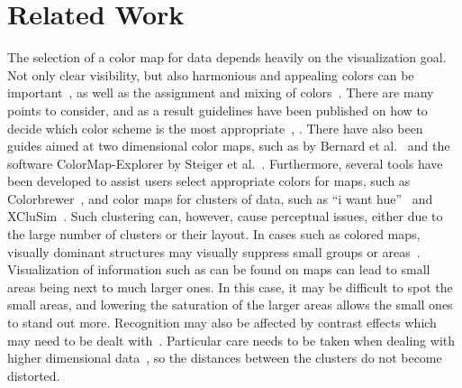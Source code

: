 \documentclass{egpubl}
\begin{document}
	\section{Related Work}

%		
	The selection of a color map for data depends heavily on the visualization goal. 
	Not only clear visibility, but also harmonious and appealing colors can be important~\cite{ihaka2003colour}, as well as the assignment and mixing of colors~\cite{wang2008color}. 
	There are many points to consider, and as a result guidelines have been published on how to decide which color scheme is the most appropriate~\cite{bergman1995rule}, \cite{healey1996choosing}. There have also been guides aimed at two dimensional color maps, such as by Bernard et al.~\cite{bernard2015survey} and the software ColorMap-Explorer by Steiger et al.~\cite{steiger2015explorative}.	
	Furthermore, several tools have been developed to assist users select appropriate colors for maps, such as Colorbrewer~\cite{harrower2003colorbrewer}, and color maps for clusters of data, such as ``i want hue''~\cite{iwanthue} and XCluSim~\cite{l2015xclusim}. 	
	Such clustering can, however, cause perceptual issues, either due to the large number of clusters or their layout.
	In cases such as colored maps, visually dominant structures may visually suppress small groups or areas~\cite{lee2013perceptually}.
	Visualization of information such as can be found on maps can lead to small areas being next to much larger ones. 
	In this case, it may be difficult to spot the small areas, and lowering the saturation of the larger areas allows the small ones to stand out more.
	Recognition may also be affected by contrast effects which may need to be dealt with~\cite{mittelstadt2014methods}. 
	Particular care needs to be taken when dealing with higher dimensional data~\cite{mittelstiidt2014revisiting}, so the distances between the clusters do not become distorted. 
	
\end{document}
